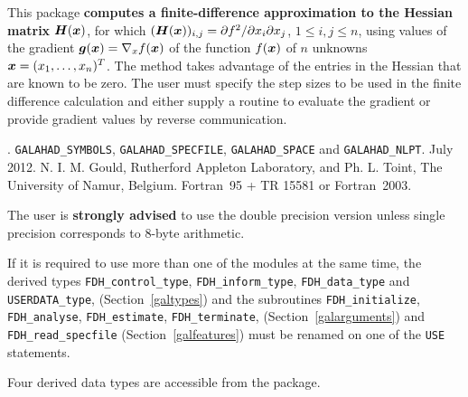 \documentclass{galahad}
\newcommand{\packagename}{FDH}
\newcommand{\fullpackagename}{\libraryname\_\packagename}
\begin{document}
\galheader


\galsummary
This package 
{\bf computes a finite-difference approximation to the Hessian matrix} 
${\bm{H}}({\bm{x}})$, for which  
$({\bm{H}}({\bm{x}}))_{i,j} = \partial f^2 / \partial x_i \partial x_j$,
$1 \leq i, j \leq n$,  
using values of the gradient ${\bm{g}}({\bm{x}}) = \nabla_x f({\bm{x}})$ 
of the function $f({\bm{x}})$ of $n$ unknowns ${\bm{x}} = (x_1, \ldots, x_n)^T$. 
The method takes advantage of the entries in the Hessian that are known to
be zero.  The user must specify the step sizes to be used in the
finite difference calculation and either supply a routine to evaluate
the gradient or provide gradient values by reverse communication.


\galattributes
\galversions{\tt  \fullpackagename\_single, \fullpackagename\_double}.
\galuses 
{\tt GALAHAD\_SY\-M\-BOLS}, 
{\tt GALAHAD\_SP\-ECFILE},
{\tt GALAHAD\_SPACE} and
{\tt GALAHAD\_NLPT}.
\galdate July 2012.
\galorigin N. I. M. Gould, Rutherford Appleton Laboratory,
and Ph. L. Toint, The University of Namur, Belgium.
\gallanguage Fortran~95 + TR 15581 or Fortran~2003. 


\galhowto



The user is {\bf strongly advised} to use the double
precision version unless single precision corresponds to 8-byte arithmetic.

\noindent
If it is required to use more than one of the modules at the same time, 
the derived types
{\tt \packagename\_control\_type}, 
{\tt \packagename\_inform\_type},
{\tt \packagename\_data\_type}
and
{\tt USERDATA\_type},
(Section~\ref{galtypes})
and the subroutines
{\tt \packagename\_initialize}, 
{\tt \packagename\_\-analyse},
{\tt \packagename\_\-estimate},
{\tt \packagename\_terminate},
(Section~\ref{galarguments})
and 
{\tt \packagename\_read\_specfile}
(Section~\ref{galfeatures})
must be renamed on one of the {\tt USE} statements.





\galtypes
Four derived data types are accessible from the package.
\end{document}
